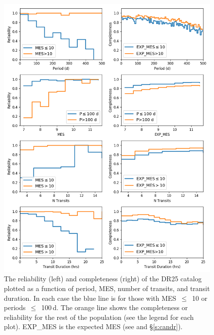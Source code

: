 \begin{figure}[htb]
 \begin{center}
  \includegraphics[width=0.95\linewidth]{fig-compRel1D-PerMes.png}
  \caption{The reliability (left) and completeness (right)  of the DR25 catalog plotted as a function of period, MES, number of transits, and transit duration. In each case the blue line is for those with MES~$\leq$~10 or periods~$\leq$~100\,d. The orange line shows the completeness or reliability for the rest of the population (see the legend for each plot). EXP\_MES is the expected MES (see \citealt{Christiansen2017} and \S\ref{s:candr}).}
  \label{f:1dcompare}
 \end{center}
 \end{figure}


